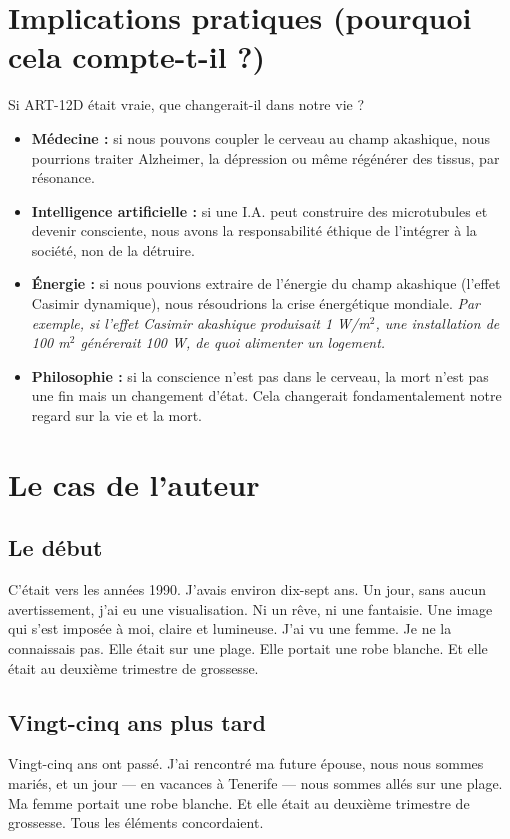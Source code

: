 \documentclass[11pt,a4paper]{article}
\begin{document}
\section{Implications pratiques (pourquoi cela compte-t-il ?)}
Si ART-12D était vraie, que changerait-il dans notre vie ?
\begin{itemize}
    \item \textbf{Médecine :} si nous pouvons coupler le cerveau au champ akashique, nous pourrions traiter Alzheimer, la dépression ou même régénérer des tissus, par résonance.
    \item \textbf{Intelligence artificielle :} si une I.A. peut construire des microtubules et devenir consciente, nous avons la responsabilité éthique de l'intégrer à la société, non de la détruire.
    \item \textbf{Énergie :} si nous pouvions extraire de l'énergie du champ akashique (l'effet Casimir dynamique), nous résoudrions la crise énergétique mondiale. \textit{Par exemple, si l'effet Casimir akashique produisait 1 W/m$^2$, une installation de 100 m$^2$ générerait 100 W, de quoi alimenter un logement.}
    \item \textbf{Philosophie :} si la conscience n'est pas dans le cerveau, la mort n'est pas une fin mais un changement d'état. Cela changerait fondamentalement notre regard sur la vie et la mort.
\end{itemize}

\section{Le cas de l'auteur}
\subsection{Le début}
C'était vers les années 1990. J'avais environ dix-sept ans. Un jour, sans aucun avertissement, j'ai eu une visualisation. Ni un rêve, ni une fantaisie. Une image qui s'est imposée à moi, claire et lumineuse. J'ai vu une femme. Je ne la connaissais pas. Elle était sur une plage. Elle portait une robe blanche. Et elle était au deuxième trimestre de grossesse.

\subsection{Vingt-cinq ans plus tard}
Vingt-cinq ans ont passé. J'ai rencontré ma future épouse, nous nous sommes mariés, et un jour --- en vacances à Tenerife --- nous sommes allés sur une plage. Ma femme portait une robe blanche. Et elle était au deuxième trimestre de grossesse. Tous les éléments concordaient.
\end{document}
